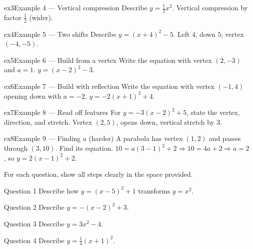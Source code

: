 \documentclass[11pt]{article}
\begin{document}
\begin{example}{ex3}{Example 4 --- Vertical compression}
Describe $y=\tfrac12x^2$.
\soln Vertical compression by factor $\tfrac12$ (wider).
\end{example}

\begin{example}{ex4}{Example 5 --- Two shifts}
Describe $y=(x+4)^2-5$.
\soln Left $4$, down $5$; vertex $(-4,-5)$.
\end{example}

\begin{example}{ex5}{Example 6 --- Build from a vertex}
Write the equation with vertex $(2,-3)$ and $a=1$.
\soln $y=(x-2)^2-3.$
\end{example}

\begin{example}{ex6}{Example 7 --- Build with reflection}
Write the equation with vertex $(-1,4)$ opening down with $a=-2$.
\soln $y=-2(x+1)^2+4.$
\end{example}

\begin{example}{ex7}{Example 8 --- Read off features}
For $y=-3(x-2)^2+5$, state the vertex, direction, and stretch.
\soln Vertex $(2,5)$, opens down, vertical stretch by $3$.
\end{example}

\begin{example}{ex8}{Example 9 --- Finding $a$ (harder)}
A parabola has vertex $(1,2)$ and passes through $(3,10)$. Find its equation.
\soln $10=a(3-1)^2+2\Rightarrow 10=4a+2\Rightarrow a=2$, so $y=2(x-1)^2+2.$
\end{example}

\clearpage
{}
For each question, show all steps clearly in the space provided.

\begin{qbox}{Question 1}
Describe how $y=(x-5)^2+1$ transforms $y=x^2$.\workspace{2.0cm}
\end{qbox}

\begin{qbox}{Question 2}
Describe $y=-(x-2)^2+3$.\workspace{2.0cm}
\end{qbox}

\begin{qbox}{Question 3}
Describe $y=3x^2-4$.\workspace{2.0cm}
\end{qbox}

\begin{qbox}{Question 4}
Describe $y=\tfrac14(x+1)^2$.\workspace{2.0cm}
\end{qbox}
\end{document}
